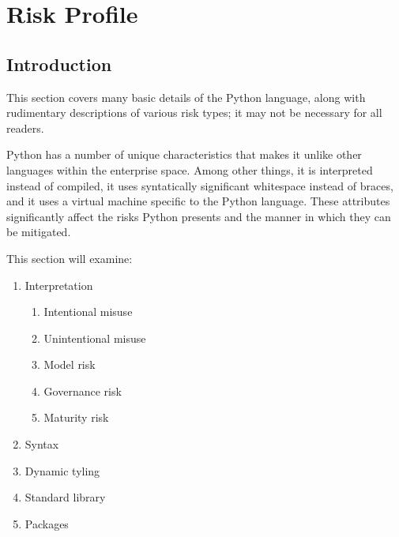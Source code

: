 \section{Risk Profile}
\thispagestyle{section_start_style}

	\subsection{Introduction}

		\begin{tcolorbox}
			This section covers many basic details of the Python language, along with rudimentary descriptions of various risk types; it may not be necessary for all readers.
		\end{tcolorbox}

		Python has a number of unique characteristics that makes it unlike other languages within the enterprise space. Among other things, it is interpreted instead of compiled, it uses syntatically significant whitespace instead of braces, and it uses a virtual machine specific to the Python language. These attributes significantly affect the risks Python presents and the manner in which they can be mitigated.

		This section will examine:

		\begin{enumerate}
   			\item Interpretation
   			\begin{enumerate}
	   			\item Intentional misuse
	   			\item Unintentional misuse
	   			\item Model risk
	   			\item Governance risk
	   			\item Maturity risk
   			\end{enumerate}
   			\item Syntax
   			\item Dynamic tyling
   			\item Standard library
   			\item Packages
		\end{enumerate}

